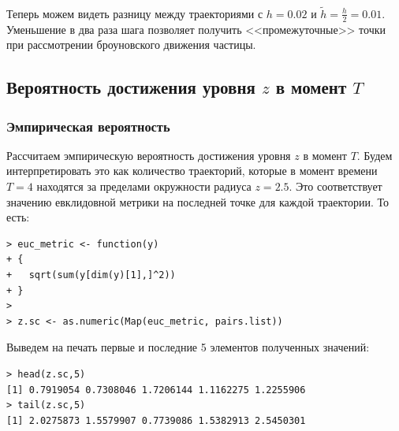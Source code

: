 \documentclass[14pt,a4paper]{scrartcl}
\begin{document}
\begin{figure}[H]
	\begin{minipage}[h]{1\linewidth}
		  \\
	\end{minipage}
\end{figure}


Теперь можем видеть разницу между траекториями с $h = 0.02$ и ${\tilde{h} = \frac{h}{2} = 0.01}$. Уменьшение в два раза шага позволяет получить <<промежуточные>> точки при рассмотрении броуновского движения частицы.


\subsection{Вероятность достижения уровня $z$ в момент $T$}

\subsubsection{Эмпирическая вероятность}

Рассчитаем эмпирическую вероятность достижения уровня $z$ в момент $T$. Будем интерпретировать это как количество траекторий, которые в момент времени $T = 4$ находятся за пределами окружности радиуса $z = 2.5$. Это соответствует значению евклидовной метрики на последней точке для каждой траектории. То есть:

\begin{verbatim}
> euc_metric <- function(y)
+ {
+   sqrt(sum(y[dim(y)[1],]^2))
+ }
> 
> z.sc <- as.numeric(Map(euc_metric, pairs.list))
\end{verbatim}

Выведем на печать первые и последние 5 элементов полученных значений:
\begin{verbatim}
> head(z.sc,5)
[1] 0.7919054 0.7308046 1.7206144 1.1162275 1.2255906
> tail(z.sc,5)
[1] 2.0275873 1.5579907 0.7739086 1.5382913 2.5450301
\end{verbatim}
\end{document}

